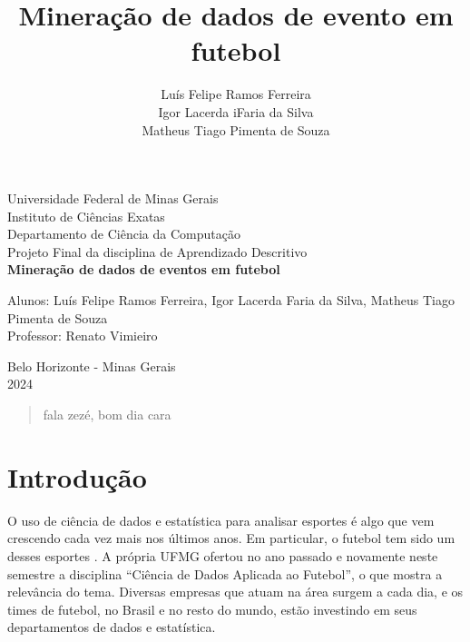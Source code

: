 \documentclass{article}
\begin{document}
\begin{titlepage}
	\begin{center}
		{\large Universidade Federal de Minas Gerais}\\[0.2cm]
		{\large Instituto de Ciências Exatas}\\[0.2cm]
		{\large Departamento de Ciência da Computação}\\[0.2cm]
		{\large Projeto Final da disciplina de Aprendizado
		Descritivo}\\[5.1cm]
		{\large \bf Mineração de dados de eventos em futebol}\\[5.1cm]
	\end{center}
	{\large Alunos: Luís Felipe Ramos Ferreira, Igor Lacerda Faria da
	Silva,
	Matheus Tiago Pimenta de Souza}\\[0.7cm]
	{\large Professor: Renato Vimieiro}\\[5.1cm]
	\begin{center}
		{\large Belo Horizonte - Minas Gerais}\\[0.2cm]
		{\large 2024}
	\end{center}
\end{titlepage}

\newpage
\begin{quote}
	fala zezé, bom dia cara
\end{quote}

\newpage
\renewcommand{\contentsname}{Sumário}
\tableofcontents
\newpage

\title{Mineração de dados de evento em futebol}
\author{Luís Felipe Ramos Ferreira \\  Igor Lacerda iFaria da Silva \\ Matheus
	Tiago Pimenta de Souza}

\maketitle

\section{Introdução}

O uso de ciência de dados e estatística para analisar esportes é algo que vem
crescendo cada vez mais nos últimos anos. Em
particular, o futebol tem sido um desses
esportes \cite{takvorian2021beautiful}. A própria UFMG ofertou no
ano passado e novamente neste semestre a disciplina ``Ciência de Dados Aplicada
ao Futebol'', o que mostra a relevância do tema. Diversas empresas que atuam na
área surgem a cada dia, e os times de futebol, no Brasil e no resto do
mundo, estão investindo em seus departamentos de dados e estatística.
\end{document}
